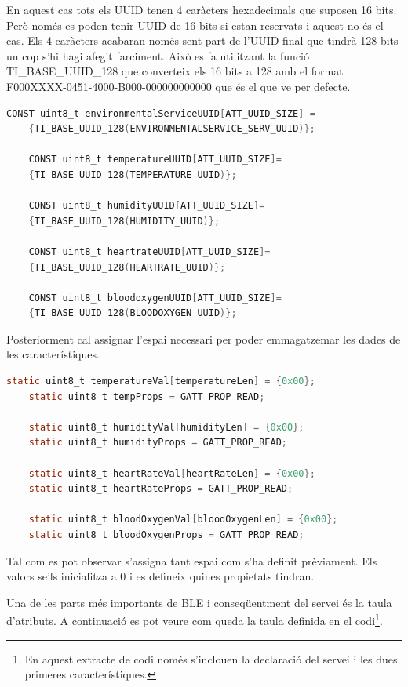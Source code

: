 En aquest cas tots els UUID tenen 4 caràcters hexadecimals que suposen 16 bits. Però només es poden tenir UUID de 16 bits si estan reservats i aquest no és el cas.
Els 4 caràcters acabaran només sent part de l'UUID final que tindrà 128 bits un cop s'hi hagi afegit farciment.
Això es fa utilitzant la funció TI\_BASE\_UUID\_128 que converteix els 16 bits a 128 amb el format F000XXXX-0451-4000-B000-000000000000 que és el que ve per defecte.

\begin{lstlisting}[language=C]
	CONST uint8_t environmentalServiceUUID[ATT_UUID_SIZE] =
	{TI_BASE_UUID_128(ENVIRONMENTALSERVICE_SERV_UUID)};
	
	CONST uint8_t temperatureUUID[ATT_UUID_SIZE]=
	{TI_BASE_UUID_128(TEMPERATURE_UUID)};
	
	CONST uint8_t humidityUUID[ATT_UUID_SIZE]=
	{TI_BASE_UUID_128(HUMIDITY_UUID)};
	
	CONST uint8_t heartrateUUID[ATT_UUID_SIZE]=
	{TI_BASE_UUID_128(HEARTRATE_UUID)};
	
	CONST uint8_t bloodoxygenUUID[ATT_UUID_SIZE]=
	{TI_BASE_UUID_128(BLOODOXYGEN_UUID)};
\end{lstlisting}

Posteriorment cal assignar l'espai necessari per poder emmagatzemar les dades de les característiques.

\begin{lstlisting}[language=C]
	static uint8_t temperatureVal[temperatureLen] = {0x00};
	static uint8_t tempProps = GATT_PROP_READ;
	
	static uint8_t humidityVal[humidityLen] = {0x00};
	static uint8_t humidityProps = GATT_PROP_READ;
	
	static uint8_t heartRateVal[heartRateLen] = {0x00};
	static uint8_t heartRateProps = GATT_PROP_READ;
	
	static uint8_t bloodOxygenVal[bloodOxygenLen] = {0x00};
	static uint8_t bloodOxygenProps = GATT_PROP_READ;
\end{lstlisting}

Tal com es pot observar s'assigna tant espai com s'ha definit prèviament.
Els valors se'ls inicialitza a 0 i es defineix quines propietats tindran.

Una de les parts més importants de BLE i conseqüentment del servei és la taula d'atributs.
A continuació es pot veure com queda la taula definida en el codi\footnote{En aquest extracte de codi només s'inclouen la declaració del servei i les dues primeres característiques.}.

